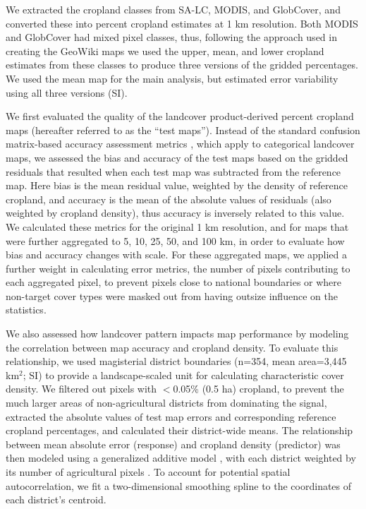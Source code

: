 \documentclass[a4paper]{article}
\begin{document}
We extracted the cropland classes from SA-LC, MODIS, and GlobCover, and converted these into percent cropland estimates at 1 km resolution. Both MODIS and GlobCover had mixed pixel classes, thus, following the approach used in creating the GeoWiki maps \citep{fritz_mapping_2015} we used the upper, mean, and lower cropland estimates from these classes to produce three versions of the gridded percentages. We used the mean map for the main analysis, but estimated error variability using all three versions (SI).

We first evaluated the quality of the landcover product-derived percent cropland maps (hereafter referred to as the ``test maps''). Instead of the standard confusion matrix-based accuracy assessment metrics \citep{olofsson_good_2014,olofsson_making_2013}, which apply to categorical landcover maps, we assessed the bias and accuracy of the test maps based on the gridded residuals that resulted when each test map was subtracted from the reference map. Here bias is the mean residual value, weighted by the density of reference cropland, and accuracy is the mean of the absolute values of residuals (also weighted by cropland density), thus accuracy is inversely related to this value. We calculated these metrics for the original 1 km resolution, and for maps that were further aggregated to 5, 10, 25, 50, and 100 km, in order to evaluate how bias and accuracy changes with scale. For these aggregated maps, we applied a further weight in calculating error metrics, the number of pixels contributing to each aggregated pixel, to prevent pixels close to national boundaries or where non-target cover types were masked out from having outsize influence on the statistics. 

We also assessed how landcover pattern impacts map performance by modeling the correlation between map accuracy and cropland density.  To evaluate this relationship, we used magisterial district boundaries (n=354, mean area=3,445 km$^2$; SI) to provide a landscape-scaled unit for calculating characteristic cover density. We filtered out pixels with $<$0.05\% (0.5 ha) cropland, to prevent the much larger areas of non-agricultural districts from dominating the signal, extracted the absolute values of test map errors and corresponding reference cropland percentages, and calculated their district-wide means. The relationship between mean absolute error (response) and cropland density (predictor) was then modeled using a generalized additive model \citep{hastie_generalized_1990}, with each district weighted by its number of agricultural pixels \citep{wood_mgcv:_2001}. To account for potential spatial autocorrelation, we fit a two-dimensional smoothing spline to the coordinates of each district's centroid.
\end{document}
